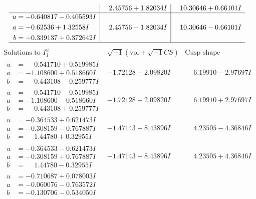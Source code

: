\documentclass[1p]{elsarticle_modified}
\theoremstyle{definition}
\newcommand{\I}{\sqrt{-1}}
\begin{document}
$$\begin{array}{c|c|c}
 & \phantom{-}2.45756 + 1.82034 I & \phantom{-}10.30646 + 0.66101 I \\ \hline\begin{aligned}
u &= -0.640817 - 0.405593 I \\
a &= -0.62536 + 1.32558 I \\
b &= -0.339137 + 0.372642 I\end{aligned}
 & \phantom{-}2.45756 - 1.82034 I & \phantom{-}10.30646 - 0.66101 I\\
 \hline 
 \end{array}$$\newpage$$\begin{array}{c|c|c}  
\text{Solutions to }I^u_{1}& \I (\text{vol} + \sqrt{-1}CS) & \text{Cusp shape}\\
 \hline 
\begin{aligned}
u &= \phantom{-}0.541710 + 0.519985 I \\
a &= -1.108600 + 0.518660 I \\
b &= \phantom{-}0.443108 - 0.259777 I\end{aligned}
 & -1.72128 + 2.09820 I & \phantom{-}6.19910 - 2.97697 I \\ \hline\begin{aligned}
u &= \phantom{-}0.541710 - 0.519985 I \\
a &= -1.108600 - 0.518660 I \\
b &= \phantom{-}0.443108 + 0.259777 I\end{aligned}
 & -1.72128 - 2.09820 I & \phantom{-}6.19910 + 2.97697 I \\ \hline\begin{aligned}
u &= -0.364533 + 0.621473 I \\
a &= -0.308159 - 0.767887 I \\
b &= \phantom{-}1.44780 + 0.32955 I\end{aligned}
 & -1.47143 + 8.43896 I & \phantom{-}4.23505 - 4.36846 I \\ \hline\begin{aligned}
u &= -0.364533 - 0.621473 I \\
a &= -0.308159 + 0.767887 I \\
b &= \phantom{-}1.44780 - 0.32955 I\end{aligned}
 & -1.47143 - 8.43896 I & \phantom{-}4.23505 + 4.36846 I \\ \hline\begin{aligned}
u &= -0.710687 + 0.078003 I \\
a &= -0.060076 - 0.763572 I \\
b &= -0.130706 - 0.534050 I\end{aligned}

\end{array}$$
\end{document}
